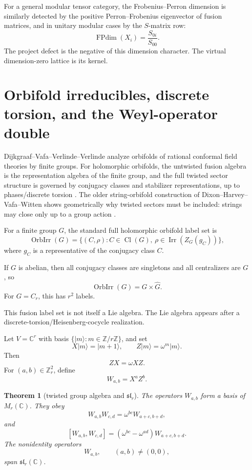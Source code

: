 \documentclass[11pt]{article}
\newtheorem{theorem}{Theorem}[section]
\theoremstyle{remark}
\newcommand{\ZZ}{\mathbb Z}
\newcommand{\CC}{\mathbb C}
\begin{document}
For a general modular tensor category, the Frobenius--Perron dimension is similarly detected by the positive Perron--Frobenius eigenvector of fusion matrices, and in unitary modular cases by the $S$-matrix row:
\[
        \operatorname{FPdim}(X_i)=\frac{S_{0i}}{S_{00}}.
\]
The project defect is the negative of this dimension character.  The virtual dimension-zero lattice is its kernel.

\section{Orbifold irreducibles, discrete torsion, and the Weyl-operator double}

Dijkgraaf--Vafa--Verlinde--Verlinde analyze orbifolds of rational conformal field theories by finite groups.  For holomorphic orbifolds, the untwisted fusion algebra is the representation algebra of the finite group, and the full twisted sector structure is governed by conjugacy classes and stabilizer representations, up to phases/discrete torsion \cite{DVVV}.  The older string-orbifold construction of Dixon--Harvey--Vafa--Witten shows geometrically why twisted sectors must be included: strings may close only up to a group action \cite{DixonHarveyVafaWitten}.

For a finite group $G$, the standard full holomorphic orbifold label set is
\[
        \operatorname{OrbIrr}(G)=\{(C,\rho): C\in\operatorname{Cl}(G),\ \rho\in\operatorname{Irr}(Z_G(g_C))\},
\]
where $g_C$ is a representative of the conjugacy class $C$.

If $G$ is abelian, then all conjugacy classes are singletons and all centralizers are $G$, so
\[
        \operatorname{OrbIrr}(G)=G\times\widehat G.
\]
For $G=C_r$, this has $r^2$ labels.

This fusion label set is not itself a Lie algebra.  The Lie algebra appears after a discrete-torsion/Heisenberg-cocycle realization.

Let $V=\CC^r$ with basis $\{|m\rangle:m\in\ZZ/r\ZZ\}$, and set
\[
        X|m\rangle=|m+1\rangle,
        \qquad
        Z|m\rangle=\omega^m|m\rangle.
\]
Then
\[
        ZX=\omega XZ.
\]
For $(a,b)\in\ZZ_r^2$, define
\[
        W_{a,b}=X^aZ^b.
\]

\begin{theorem}[twisted group algebra and $\mathfrak{sl}_r$]
The operators $W_{a,b}$ form a basis of $M_r(\CC)$.  They obey
\[
        W_{a,b}W_{c,d}=\omega^{bc}W_{a+c,b+d},
\]
and
\[
        [W_{a,b},W_{c,d}]
        =\left(\omega^{bc}-\omega^{ad}\right)W_{a+c,b+d}.
\]
The nonidentity operators
\[
        W_{a,b},\qquad (a,b)\ne(0,0),
\]
span $\mathfrak{sl}_r(\CC)$.
\end{theorem}
\end{document}

